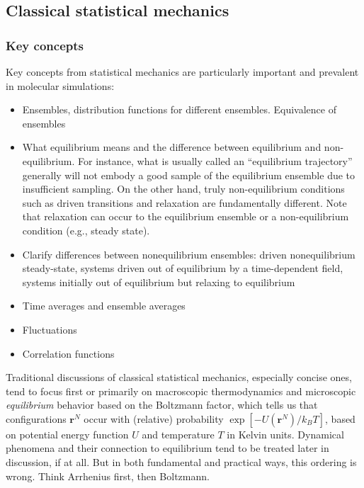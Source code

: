 \documentclass[9pt,bestpractices]{livecoms}
\newcommand{\conf}{\mathbf{r}^N}
\begin{document}
\subsection{Classical statistical mechanics}
\label{sec:stat_mech}
\subsubsection{Key concepts}
Key concepts from statistical mechanics are particularly important and prevalent in molecular simulations:
\begin{itemize}
\item Ensembles, distribution functions for different ensembles. Equivalence of ensembles
\item What equilibrium means and the difference between equilibrium and non-equilibrium.
    For instance, what is usually called an ``equilibrium trajectory'' generally will not embody a good sample of the equilibrium ensemble due to insufficient sampling.  
        On the other hand, truly non-equilibrium conditions such as driven transitions and relaxation are fundamentally different. 
        Note that relaxation can occur to the equilibrium ensemble or a non-equilibrium condition (e.g., steady state).
\item Clarify differences between nonequilibrium ensembles: driven
    nonequilibrium steady-state, systems driven out of equilibrium by a time-dependent field, systems initially out of equilibrium but relaxing
        to equilibrium
\item Time averages and ensemble averages
\item Fluctuations
\item Correlation functions
\end{itemize}

Traditional discussions of classical statistical mechanics, especially concise ones, tend to focus first or primarily on macroscopic thermodynamics and microscopic \emph{equilibrium} behavior based on the Boltzmann factor, which tells us that configurations $\conf$ occur with (relative) probability $\exp[-U(\conf)/k_B T]$, based on potential energy function $U$ and temperature $T$ in Kelvin units.  
Dynamical phenomena and their connection to equilibrium tend to be treated later in discussion, if at all.  
But in both fundamental and practical ways, this ordering is wrong.  
Think Arrhenius first, then Boltzmann.
\end{document}
